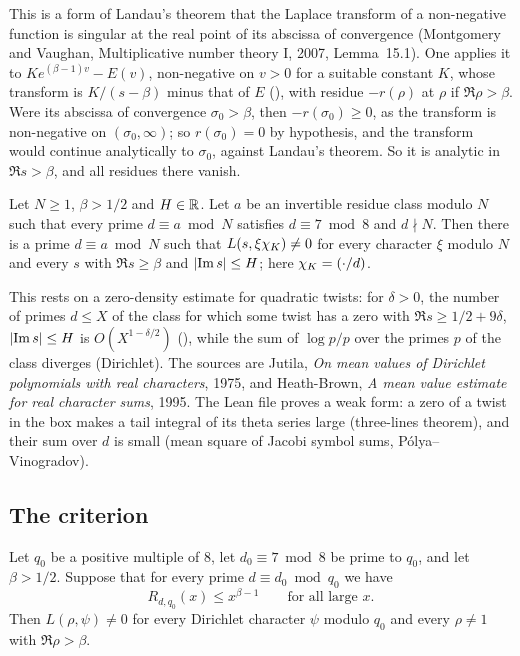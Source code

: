 This is a form of Landau's theorem that the Laplace transform of a non-negative function is
singular at the real point of its abscissa of convergence (Montgomery and Vaughan,
Multiplicative number theory I, 2007, Lemma~15.1). One applies it to
$K e^{(\beta-1)v} - E(v)$, non-negative on $v > 0$ for a suitable constant $K$, whose transform is $K/(s-\beta)$ minus that of $E$ (), with
residue $-r(\rho)$ at $\rho$ if $\Re\rho > \beta$. Were its abscissa of convergence $\sigma_0 >
\beta$, then $-r(\sigma_0) \ge 0$, as the transform is non-negative on $(\sigma_0,\infty)$; so
$r(\sigma_0) = 0$ by hypothesis, and the transform would continue analytically to $\sigma_0$,
against Landau's theorem. So it is analytic in $\Re s > \beta$, and all residues there vanish.

\begin{fact}\label{zeros:fact:prime}
Let $N \ge 1$, $\beta > 1/2$ and $H \in \mathbb{R}$. Let $a$ be an invertible residue class modulo $N$ such
that every prime $d \equiv a \bmod N$ satisfies $d \equiv 7 \bmod 8$ and $d \nmid N$. Then there
is a prime $d \equiv a \bmod N$ such that $L(s, \xi\chi_K) \ne 0$ for every character $\xi$ modulo
$N$ and every $s$ with $\Re s \ge \beta$ and $\lvert\operatorname{Im} s\rvert \le H$; here $\chi_K = (\cdot/d)$.
\end{fact}

This rests on a zero-density estimate for quadratic twists: for $\delta > 0$, the number of primes
$d \le X$ of the class for which some twist has a zero with $\Re s \ge 1/2 + 9\delta$,
$\lvert\operatorname{Im} s\rvert \le H$ is $O(X^{1-\delta/2})$ (), while the sum of
$\log p/p$ over the primes $p$ of the class diverges (Dirichlet). The sources
are Jutila, \emph{On mean values of Dirichlet polynomials with real characters}, 1975, and
Heath-Brown, \emph{A mean value estimate for real character sums}, 1995. The Lean file
 proves a weak form: a zero of a twist in the box makes a
tail integral of its theta series large (three-lines theorem), and their sum over
$d$ is small (mean square of Jacobi symbol sums, P\'olya--Vinogradov).

\subsection{The criterion}

\begin{theorem}
\label{zeros:thm:criterion}
Let $q_0$ be a positive multiple of $8$, let $d_0 \equiv 7 \bmod 8$ be prime to $q_0$, and let
$\beta > 1/2$. Suppose that for every prime $d \equiv d_0 \bmod q_0$ we have
\[
  R_{d,q_0}(x) \le x^{\beta - 1} \qquad \text{for all large } x .
\]
Then $L(\rho,\psi) \ne 0$ for every Dirichlet character $\psi$ modulo $q_0$ and every
$\rho \ne 1$ with $\Re \rho > \beta$.
\end{theorem}

